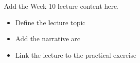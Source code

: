 Add the Week 10 lecture content here.

\begin{itemize}
  \item Define the lecture topic
  \item Add the narrative arc
  \item Link the lecture to the practical exercise
\end{itemize}
